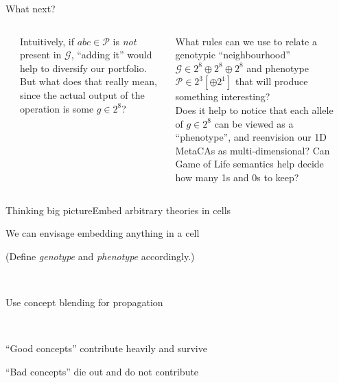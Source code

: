 \begin{frame}[fragile]{What next?}{}
\begin{columns}[]
\begin{column}[T]{.1cm}
\end{column}
\begin{column}[T]{5.4cm}
\vspace*{.2cm}

{\small Intuitively, if $abc\in\mathcal{P}$ is \emph{not} present in $\mathcal{G}$,
  ``adding it'' would help to diversify our
portfolio.  But what does that really mean, since the
actual output of the operation is some $g\in2^8$?}
\end{column}
\begin{column}[T]{5.3cm}
\vspace{-.05in}
{\small What rules can we use to relate a genotypic ``neighbourhood'' $\mathcal{G}\in 2^8\oplus2^8\oplus2^8$
and phenotype $\mathcal{P}\in 2^3 [\oplus2^1]$ that will produce
something interesting?} \\[.3cm]
\vspace{.1in}
{\small Does it help to notice that each allele of $g\in2^8$ can be viewed as
a ``phenotype'', and reenvision our 1D MetaCAs as multi-dimensional?  Can Game of Life semantics help decide how many 1s and 0s to keep?}
\end{column}
\begin{column}[T]{.1cm}
\end{column}
\end{columns}
\end{frame}

\begin{frame}{Thinking big picture}{Embed arbitrary theories in cells}
{
\begin{center}
\item{We can envisage embedding anything in a cell}
\item{(Define \emph{genotype} and \emph{phenotype} accordingly.)}
\item{~}
\item{Use concept blending for propagation}
\item{~}
\item{``Good concepts'' contribute heavily and survive}
\item{``Bad concepts'' die out and do not contribute}
\end{center}}
\end{frame}
